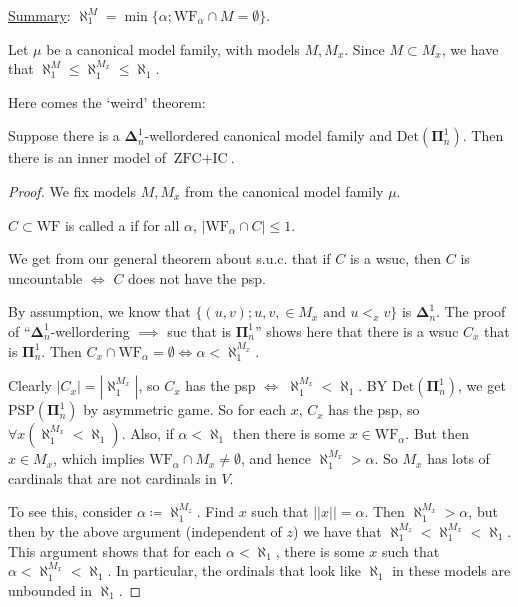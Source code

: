 \documentclass[]{article}
\newcommand{\bopi}{\bm{\Pi}}
\newcommand{\bodel}{\bm{\Delta}}
\newcommand{\Det}{\textrm{Det}}
\newcommand{\psp}{\textrm{PSP}}
\newcommand{\wf}{\textrm{WF}}
\newcommand{\zfc}{\textrm{ZFC}}
\newcommand{\ic}{\textrm{IC}}
\begin{document}
\underline{Summary}: $\aleph_1^M = \min \{\alpha ; \wf_\alpha \cap M = \emptyset\}$. 

Let $\mu$ be a canonical model family, with models $M,M_x$. Since $M\subset M_x$, we have that $\aleph_1^M\le \aleph_1^{M_x}\le \aleph_1$. 

Here comes the `weird' theorem:

\begin{theorem*}
    Suppose there is a $\bodel^1_n$-wellordered canonical model family and $\Det(\bopi^1_n)$. Then there is an inner model of $\zfc + \ic$.
\end{theorem*}
\begin{proof}
    We fix models $M,M_x$ from the canonical model family $\mu$.

    \begin{defin*}
        $C\subset \wf$ is called a  if for all $\alpha$, $|\wf_\alpha \cap C| \le 1$.
    \end{defin*}

    We get from our general theorem about s.u.c. that  if $C$ is a wsuc, then $C$ is uncountable $\iff$ $C$ does not have the psp.

    By assumption, we know that $\{(u,v);u,v,\in M_x\textrm{ and }u<_x v\}$ is $\bodel^1_n$. The proof of ``$\bodel^1_n$-wellordering $\implies$ suc that is $\bopi^1_n$'' shows here that there is a wsuc $C_x$ that is $\bopi^1_n$. Then $C_x \cap \wf_\alpha = \emptyset \iff \alpha < \aleph_1^{M_x}$.

    Clearly $|C_x| = |\aleph_1^{M_x}|$, so $C_x$ has the psp $\iff$ $\aleph_1^{M_x} < \aleph_1$. BY $\Det(\bopi^1_n)$, we get $\psp(\bopi^1_n)$ by asymmetric game. So for each $x$, $C_x$ has the psp, so $\forall x (\aleph_1^{M_x} < \aleph_1)$. Also, if $\alpha < \aleph_1$ then there is some $x \in \wf_\alpha$. But then $x\in M_x$, which implies $\wf_\alpha\cap M_x \ne \emptyset$, and hence $\aleph_1^{M_x} > \alpha$. So $M_x$ has lots of cardinals that are not cardinals in $V$.

    To see this, consider $\alpha \coloneqq \aleph_1^{M_z}$. Find $x$ such that $||x|| = \alpha$. Then $\aleph_1^{M_x} > \alpha$, but then by the above argument (independent of $z$) we have that $\aleph_1^{M_z} < \aleph_1^{M_x} < \aleph_1$. This argument shows that for each $\alpha < \aleph_1$, there is some $x$ such that $\alpha < \aleph_1^{M_x} < \aleph_1$. In particular, the ordinals that look like $\aleph_1$ in these models are unbounded in $\aleph_1$.


\end{proof}
\end{document}

